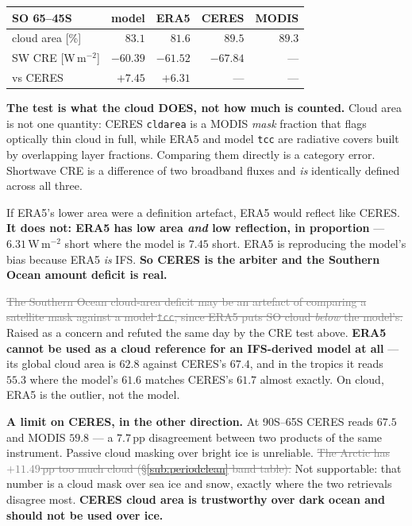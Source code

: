 \documentclass[10pt]{article}
\newcommand{\dead}[1]{\textcolor{gray}{\sout{#1}}}
\begin{document}
\begin{center}\footnotesize
\begin{tabular}{l r r r r}
\toprule
SO 65--45S & model & ERA5 & CERES & MODIS \\
\midrule
cloud area [\%] & $83.1$ & $81.6$ & $\mathbf{89.5}$ & $\mathbf{89.3}$ \\
SW CRE [W\,m$^{-2}$] & $-60.39$ & $-61.52$ & $\mathbf{-67.84}$ & --- \\
vs CERES & $\mathbf{+7.45}$ & $\mathbf{+6.31}$ & --- & --- \\
\bottomrule
\end{tabular}
\end{center}

\noindent \textbf{The test is what the cloud DOES, not how much is counted.} Cloud area is not
one quantity: CERES \texttt{cldarea} is a MODIS \emph{mask} fraction that flags optically thin
cloud in full, while ERA5 and model \texttt{tcc} are radiative covers built by overlapping
layer fractions. Comparing them directly is a category error. Shortwave CRE is a difference of
two broadband fluxes and \emph{is} identically defined across all three.

If ERA5's lower area were a definition artefact, ERA5 would reflect like CERES. \textbf{It does
not: ERA5 has low area \emph{and} low reflection, in proportion} --- $6.31$\,W\,m$^{-2}$ short
where the model is $7.45$ short. ERA5 is reproducing the model's bias because ERA5 \emph{is}
IFS. \textbf{So CERES is the arbiter and the Southern Ocean amount deficit is real.}

\dead{The Southern Ocean cloud-area deficit may be an artefact of comparing a satellite mask
against a model \texttt{tcc}, since ERA5 puts SO cloud \emph{below} the model's.} Raised as a
concern and refuted the same day by the CRE test above. \textbf{ERA5 cannot be used as a cloud
reference for an IFS-derived model at all} --- its global cloud area is $62.8$ against CERES's
$67.4$, and in the tropics it reads $55.3$ where the model's $61.6$ matches CERES's $61.7$
almost exactly. On cloud, ERA5 is the outlier, not the model.

\textbf{A limit on CERES, in the other direction.} At 90S--65S CERES reads $67.5$ and MODIS
$59.8$ --- a $7.7$\,pp disagreement between two products of the same instrument. Passive cloud
masking over bright ice is unreliable. \dead{The Arctic has $+11.49$\,pp too much cloud
(\S\ref{sub:periodclean} band table).} Not supportable: that number is a cloud mask over sea
ice and snow, exactly where the two retrievals disagree most. \textbf{CERES cloud area is
trustworthy over dark ocean and should not be used over ice.}
\end{document}
